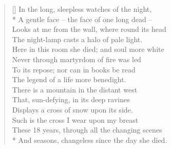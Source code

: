 \documentclass[MAIN]{subfiles}
\begin{document}
\settowidth{\versewidth}{In the long, sleepless watches of the night,}
\begin{verse}[\versewidth]
In the long, sleepless watches of the night,\\*
\vin A gentle face -- the face of one long dead --\\
\vin Looks at me from the wall, where round its head\\
The night-lamp casts a halo of pale light.\\
Here in this room she died; and soul more white\\
\vin Never through martyrdom of fire was led\\
\vin To its repose; nor can in books be read\\
The legend of a life more benedight.\\
There is a mountain in the distant west\\
\vin That, sun-defying, in its deep ravines\\
\vin \vin Displays a cross of snow upon its side.\\
Such is the cross I wear upon my breast\\
\vin These 18 years, through all the changing scenes\\* 
\vin \vin And seasons, changeless since the day she died.
\end{verse}
\end{document}
